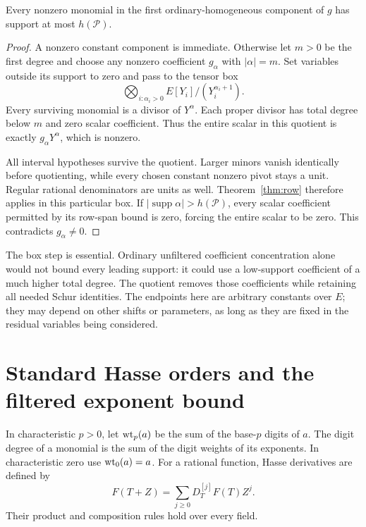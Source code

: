 \begin{theorem}\label{thm:leading-support}
Every nonzero monomial in the first ordinary-homogeneous component
of $g$ has support at most $h(\mathcal P)$.
\end{theorem}
\begin{proof}
A nonzero constant component is immediate. Otherwise let $m>0$ be
the first degree and choose any nonzero coefficient $g_\alpha$ with
$|\alpha|=m$. Set variables outside its support to zero and pass to
the tensor box
\[
 \bigotimes_{i:\alpha_i>0} E[Y_i]/(Y_i^{\alpha_i+1}).
\]
Every surviving monomial is a divisor of $Y^\alpha$. Each proper
divisor has total degree below $m$ and zero scalar coefficient. Thus
the entire scalar in this quotient is exactly $g_\alpha Y^\alpha$,
which is nonzero.

All interval hypotheses survive the quotient. Larger minors vanish
identically before quotienting, while every chosen constant nonzero
pivot stays a unit. Regular rational denominators are units as well.
Theorem~\ref{thm:row} therefore applies in this particular box. If
$|\operatorname{supp}\alpha|>h(\mathcal P)$, every scalar coefficient
permitted by its row-span bound is zero, forcing the entire scalar to
be zero. This contradicts $g_\alpha\ne0$.
\end{proof}

The box step is essential. Ordinary unfiltered coefficient concentration
alone would not bound every leading support: it could use a low-support
coefficient of a much higher total degree. The quotient removes those
coefficients while retaining all needed Schur identities.
The endpoints here are arbitrary constants over $E$; they may depend
on other shifts or parameters, as long as they are fixed in the residual
variables being considered.

\section{Standard Hasse orders and the filtered exponent bound}

In characteristic $p>0$, let $\operatorname{wt}_p(a)$ be the sum of the base-$p$
digits of $a$. The digit degree of a monomial is the sum of the digit
weights of its exponents. In characteristic zero use $\operatorname{wt}_0(a)=a$.
For a rational function, Hasse derivatives are defined by
\[
 F(T+Z)=\sum_{j\ge0}D_T^{[j]}F(T)Z^j.
\]
Their product and composition rules hold over every field.

